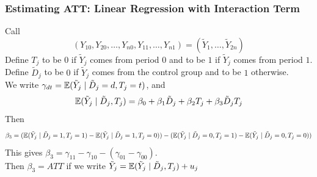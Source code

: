 \subsubsection{Estimating ATT: Linear Regression with Interaction Term}
Call
$$(Y_{10}, Y_{20}, \dots, Y_{n0}, Y_{11}, \dots, Y_{n1}) = (\tilde{Y}_1, \dots, \tilde{Y}_{2n})$$
Define $T_j$ to be $0$ if $\tilde{Y}_j$ comes from period $0$ and to be $1$ if $\tilde{Y}_j$ comes from period $1$. Define $\tilde{D}_j$ to be $0$ if $\tilde{Y}_j$ comes from the control group and to be $1$ otherwise. \\
We write $\gamma_{dt} = \mathbb{E}(\tilde{Y}_j \mid \tilde{D}_j = d, T_j = t)$, and
$$\mathbb{E}(\tilde{Y}_j \mid \tilde{D}_j, T_j) = \beta_0 + \beta_1 \tilde{D}_j + \beta_2 T_j  + \beta_3 \tilde{D}_j T_j$$
Then
$$\beta_3 = (\mathbb{E}(\tilde{Y}_j \mid \tilde{D}_j = 1, T_j = 1) - \mathbb{E}(\tilde{Y}_j \mid \tilde{D}_j = 1, T_j = 0)) - (\mathbb{E}(\tilde{Y}_j \mid \tilde{D}_j = 0, T_j = 1) - \mathbb{E}(\tilde{Y}_j \mid \tilde{D}_j = 0, T_j = 0))$$
This gives $\beta_3 = \gamma_{11} - \gamma_{10} - (\gamma_{01} - \gamma_{00})$. \\
Then $\beta_3 = ATT$ if we write $\tilde{Y}_j = \mathbb{E}(\tilde{Y}_j \mid \tilde{D}_j, T_j) + u_j$


\newpage
